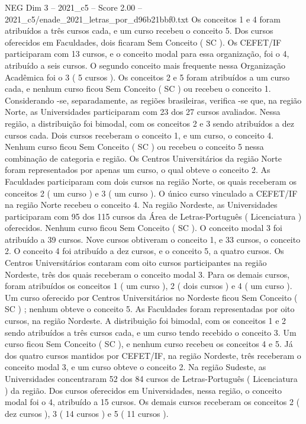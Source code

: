 \begin{textsample}{NEG Dim 3 – 2021\_c5 – Score 2.00 – 2021\_c5/enade\_2021\_letras\_por\_d96b21bbf0.txt}
Os conceitos 1 e 4 foram atribuídos a três cursos cada, e um curso recebeu o conceito 5.
Dos cursos oferecidos em Faculdades, dois ficaram Sem Conceito ( SC ).
Os CEFET/IF participaram com 13 cursos, e o conceito modal para essa organização, foi o 4, atribuído a seis cursos.
O segundo conceito mais frequente nessa Organização Acadêmica foi o 3 ( 5 cursos ).
Os conceitos 2 e 5 foram atribuídos a um curso cada, e nenhum curso ficou Sem Conceito ( SC ) ou recebeu o conceito 1.
Considerando -se, separadamente, as regiões brasileiras, verifica -se que, na região Norte, as Universidades participaram com 23 dos 27 cursos avaliados.
Nessa região, a distribuição foi bimodal, com os conceitos 2 e 3 sendo atribuídos a dez cursos cada.
Dois cursos receberam o conceito 1, e um curso, o conceito 4.
Nenhum curso ficou Sem Conceito ( SC ) ou recebeu o conceito 5 nessa combinação de categoria e região.
Os Centros Universitários da região Norte foram representados por apenas um curso, o qual obteve o conceito 2.
As Faculdades participaram com dois cursos na região Norte, os quais receberam os conceitos 2 ( um curso ) e 3 ( um curso ).
O único curso vinculado a CEFET/IF na região Norte recebeu o conceito 4.
Na região Nordeste, as Universidades participaram com 95 dos 115 cursos da Área de Letras-Português ( Licenciatura ) oferecidos.
Nenhum curso ficou Sem Conceito ( SC ).
O conceito modal 3 foi atribuído a 39 cursos.
Nove cursos obtiveram o conceito 1, e 33 cursos, o conceito 2.
O conceito 4 foi atribuído a dez cursos, e o conceito 5, a quatro cursos.
Os Centros Universitários contaram com oito cursos participantes na região Nordeste, três dos quais receberam o conceito modal 3.
Para os demais cursos, foram atribuídos os conceitos 1 ( um curso ), 2 ( dois cursos ) e 4 ( um curso ).
Um curso oferecido por Centros Universitários no Nordeste ficou Sem Conceito ( SC ) ; nenhum obteve o conceito 5.
As Faculdades foram representadas por oito cursos, na região Nordeste.
A distribuição foi bimodal, com os conceitos 1 e 2 sendo atribuídos a três cursos cada, e um curso tendo recebido o conceito 3.
Um curso ficou Sem Conceito ( SC ), e nenhum curso recebeu os conceitos 4 e 5.
Já dos quatro cursos mantidos por CEFET/IF, na região Nordeste, três receberam o conceito modal 3, e um curso obteve o conceito 2.
Na região Sudeste, as Universidades concentraram 52 dos 84 cursos de Letras-Português ( Licenciatura ) da região.
Dos cursos oferecidos em Universidades, nessa região, o conceito modal foi o 4, atribuído a 15 cursos.
Os demais cursos receberam os conceitos 2 ( dez cursos ), 3 ( 14 cursos ) e 5 ( 11 cursos ).

\end{textsample}
